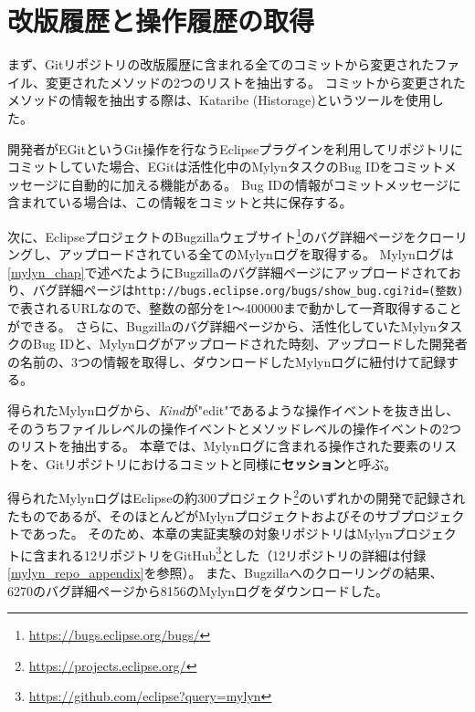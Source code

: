 \documentclass[a4paper]{jsbook}
\begin{document}
\section{改版履歴と操作履歴の取得}\label{obtainhistory_sec}
まず、Gitリポジトリの改版履歴に含まれる全てのコミットから変更されたファイル、変更されたメソッドの2つのリストを抽出する。
コミットから変更されたメソッドの情報を抽出する際は、Kataribe (Historage)\cite{Hata:2011,Fujiwara:2014}というツールを使用した。

開発者がEGitというGit操作を行なうEclipseプラグインを利用してリポジトリにコミットしていた場合、EGitは活性化中のMylynタスクのBug IDをコミットメッセージに自動的に加える機能がある。
Bug IDの情報がコミットメッセージに含まれている場合は、この情報をコミットと共に保存する。

次に、EclipseプロジェクトのBugzillaウェブサイト\footnote{\url{https://bugs.eclipse.org/bugs/}}のバグ詳細ページをクローリングし、アップロードされている全てのMylynログを取得する。
Mylynログは\ref{mylyn_chap}で述べたようにBugzillaのバグ詳細ページにアップロードされており、バグ詳細ページは\texttt{http://bugs.eclipse.org/bugs/show\_bug.cgi?id=(整数)}で表されるURLなので、整数の部分を1〜400000まで動かして一斉取得することができる。
さらに、Bugzillaのバグ詳細ページから、活性化していたMylynタスクのBug IDと、Mylynログがアップロードされた時刻、アップロードした開発者の名前の、3つの情報を取得し、ダウンロードしたMylynログに紐付けて記録する。

得られたMylynログから、{\it Kind}が"edit"であるような操作イベントを抜き出し、そのうちファイルレベルの操作イベントとメソッドレベルの操作イベントの2つのリストを抽出する。
本章では、Mylynログに含まれる操作された要素のリストを、Gitリポジトリにおけるコミットと同様に{\bf セッション}と呼ぶ。

得られたMylynログはEclipseの約300プロジェクト\footnote{\url{https://projects.eclipse.org/}}のいずれかの開発で記録されたものであるが、そのほとんどがMylynプロジェクトおよびそのサブプロジェクトであった。
そのため、本章の実証実験の対象リポジトリはMylynプロジェクトに含まれる12リポジトリをGitHub\footnote{\url{https://github.com/eclipse?query=mylyn}}とした（12リポジトリの詳細は付録\ref{mylyn_repo_appendix}を参照）。
また、Bugzillaへのクローリングの結果、6270のバグ詳細ページから8156のMylynログをダウンロードした。
\end{document}
